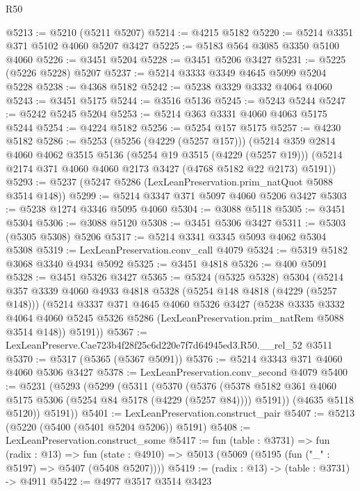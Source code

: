 \begin{lexlean}{R50}
\begin{coremodule}
@5213 := @5210 (@5211 @5207)
@5214 := @4215 @5182
@5220 := @5214 @3351 @371 @5102 @4060 @5207 @3427
@5225 := @5183 @564 @3085 @3350 @5100 @4060
@5226 := @3451 @5204
@5228 := @3451 @5206 @3427
@5231 := @5225 (@5226 @5228) @5207
@5237 := @5214 @3333 @3349 @4645 @5099 @5204 @5228
@5238 := @4368 @5182
@5242 := @5238 @3329 @3332 @4064 @4060
@5243 := @3451 @5175
@5244 := @3516 @5136
@5245 := @5243 @5244
@5247 := @5242 @5245 @5204
@5253 := @5214 @363 @3331 @4060 @4063 @5175 @5244
@5254 := @4224 @5182
@5256 := @5254 @157 @5175
@5257 := @4230 @5182
@5286 := @5253
    (@5256 (@4229 (@5257 @157)))
    (@5214
      @359
      @2814
      @4060
      @4062
      @3515
      @5136
      (@5254 @19 @3515 (@4229 (@5257 @19)))
      (@5214 @2174 @371 @4060 @4060 @2173 @3427 (@4768 @5182 @22 @2173) @5191))
@5293 := @5237 (@5247 @5286 (LexLeanPreservation.prim_natQuot @5088 @3514 @148))
@5299 := @5214 @3347 @371 @5097 @4060 @5206 @3427
@5303 := @5238 @1274 @3346 @5095 @4060
@5304 := @3088 @5118
@5305 := @3451 @5304
@5306 := @3088 @5120
@5308 := @3451 @5306 @3427
@5311 := @5303 (@5305 @5308) @5206
@5317 := @5214 @3341 @3345 @5093 @4062 @5304 @5308
@5319 := LexLeanPreservation.conv_call @4079
@5324 := @5319 @5182 @3068 @3340 @4934 @5092
@5325 := @3451 @4818
@5326 := @400 @5091
@5328 := @3451 @5326 @3427
@5365 := @5324
    (@5325 @5328)
    @5304
    (@5214
      @357
      @3339
      @4060
      @4933
      @4818
      @5328
      (@5254 @148 @4818 (@4229 (@5257 @148)))
      (@5214
        @3337
        @371
        @4645
        @4060
        @5326
        @3427
        (@5238
          @3335
          @3332
          @4064
          @4060
          @5245
          @5326
          @5286
          (LexLeanPreservation.prim_natRem @5088 @3514 @148))
        @5191))
@5367 := LexLeanPreserve.Cae723b4f28f25c6d220e7f7d64945ed3.R50.__rel_52 @3511
@5370 := @5317 (@5365 (@5367 @5091))
@5376 := @5214 @3343 @371 @4060 @4060 @5306 @3427
@5378 := LexLeanPreservation.conv_second @4079
@5400 := @5231
    (@5293
      (@5299
        (@5311
          (@5370
            (@5376
              (@5378 @5182 @361 @4060 @5175 @5306 (@5254 @84 @5178 (@4229 (@5257 @84))))
              @5191))
          (@4635 @5118 @5120))
        @5191))
@5401 := LexLeanPreservation.construct_pair
@5407 := @5213 (@5220 (@5400 (@5401 @5204 @5206)) @5191)
@5408 := LexLeanPreservation.construct_some
@5417 := fun (table : @3731) =>
  fun (radix : @13) =>
  fun (state : @4910) => @5013 (@5069 (@5195 (fun ("_" : @5197) => @5407 (@5408 @5207))))
@5419 := (radix : @13) -> (table : @3731) -> @4911
@5422 := @4977 @3517 @3514 @3423

\end{coremodule}
\end{lexlean}
